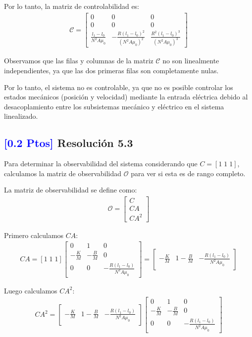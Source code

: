 \documentclass[
  11pt,
  letterpaper,
   addpoints,
   answers
  ]{exam}
\begin{document}
\begin{solution}
Por lo tanto, la matriz de controlabilidad es:
\begin{align}
\mathcal{C} = \begin{bmatrix}
0 & 0 & 0 \\
0 & 0 & 0 \\
\frac{l_1-l_0}{N^2A\mu_0} & -\frac{R(l_1-l_0)^2}{(N^2A\mu_0)^2} & \frac{R^2(l_1-l_0)^3}{(N^2A\mu_0)^3}
\end{bmatrix}
\end{align}

Observamos que las filas y columnas de la matriz $\mathcal{C}$ no son linealmente independientes, ya que las dos primeras filas son completamente nulas. 

Por lo tanto, el sistema no es controlable, ya que no es posible controlar los estados mecánicos (posición y velocidad) mediante la entrada eléctrica debido al desacoplamiento entre los subsistemas mecánico y eléctrico en el sistema linealizado.

\subsection*{\textcolor{blue}{[0.2 Ptos]} Resolución 5.3}

Para determinar la observabilidad del sistema considerando que $C = [1 \; 1 \; 1]$, calculamos la matriz de observabilidad $\mathcal{O}$ para ver si esta es de rango completo.

La matriz de observabilidad se define como:
\begin{align}
\mathcal{O} = \begin{bmatrix}
C \\
CA \\
CA^2
\end{bmatrix}
\end{align}

Primero calculamos $CA$:
\begin{align}
CA = [1 \; 1 \; 1] \begin{bmatrix}
0 & 1 & 0 \\
-\frac{K}{M} & -\frac{B}{M} & 0 \\
0 & 0 & -\frac{R(l_1-l_0)}{N^2A\mu_0}
\end{bmatrix} = \begin{bmatrix}
-\frac{K}{M} & 1-\frac{B}{M} & -\frac{R(l_1-l_0)}{N^2A\mu_0}
\end{bmatrix}
\end{align}

Luego calculamos $CA^2$:
\begin{align}
CA^2 = \begin{bmatrix}
-\frac{K}{M} & 1-\frac{B}{M} & -\frac{R(l_1-l_0)}{N^2A\mu_0}
\end{bmatrix} \begin{bmatrix}
0 & 1 & 0 \\
-\frac{K}{M} & -\frac{B}{M} & 0 \\
0 & 0 & -\frac{R(l_1-l_0)}{N^2A\mu_0}
\end{bmatrix}
\end{align}


\end{solution}
\end{document}
